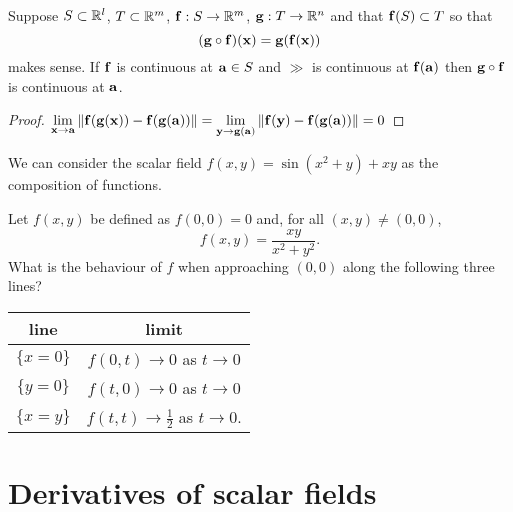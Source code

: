 \begin{theorem}
    Suppose \(S \subset \bR^l\), \(T\subset \bR^m\), \(\ff:S \to \bR^m\), \(\gg : T \to \bR^n\) and that \(\ff(S) \subset T\) so that
    \[(\gg \circ \ff)(\xx) = \gg(\ff(\xx))\]
    makes sense.
    If \(\ff\) is continuous at \(\aa\in S\) and \(\gg\) is continuous at \(\ff(\aa)\) then \(\gg\circ \ff\) is continuous at \(\aa\).
\end{theorem}

\begin{proof}
    \(\displaystyle\lim_{\xx\to\aa}\norm{\ff(\gg(\xx))-\ff(\gg(\aa))}  =\displaystyle\lim_{\yy\to\gg(\aa)}\norm{\ff(\yy)-\ff(\gg(\aa))}  =0   \)
\end{proof}

\begin{example*}
    We can consider the scalar field \(f(x,y)= \sin(x^2 + y) + x y\) as the composition of functions.
\end{example*}



\begin{example*}
    Let \(f(x,y)\) be defined as \(f(0,0)=0\) and, for all \((x,y)\neq (0,0)\),
    \[
        f(x,y) =
        \frac{x y}{x^2 + y^2}.
    \]
    What is the behaviour of \(f\) when approaching \((0,0)\) along the following three lines?
    \begin{center}
        \begin{tabular}{ c | c }
            line        & limit                                      \\
            \hline
            \(\{x=0\}\) & \(f(0,t) \to 0\) as \(t \to 0\)            \\
            \(\{y=0\}\) & \(f(t,0) \to 0\) as \(t \to 0\)            \\
            \(\{x=y\}\) & \(f(t,t) \to \frac{1}{2}\) as \(t \to 0\).
        \end{tabular}
    \end{center}
\end{example*}



\section{Derivatives of scalar fields}


